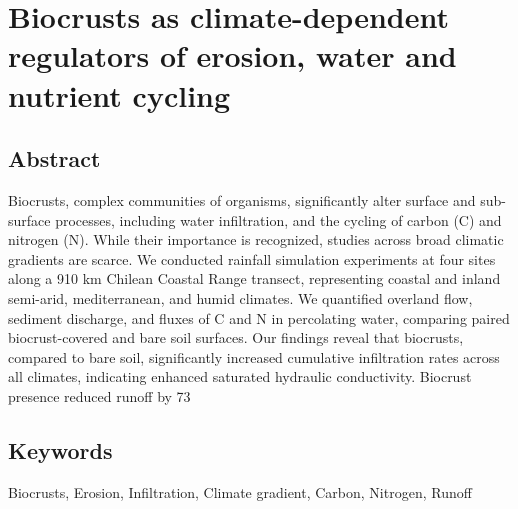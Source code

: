 \chapter{Biocrusts as climate-dependent regulators of erosion, water and nutrient cycling}
\label{chap:manuscript2} %

\section*{Abstract} %

Biocrusts, complex communities of organisms, significantly alter surface and sub-surface processes, including water infiltration, and the cycling of carbon (C) and nitrogen (N). While their importance is recognized, studies across broad climatic gradients are scarce. We conducted rainfall simulation experiments at four sites along a 910 km Chilean Coastal Range transect, representing coastal and inland semi-arid, mediterranean, and humid climates. We quantified overland flow, sediment discharge, and fluxes of C and N in percolating water, comparing paired biocrust-covered and bare soil surfaces. Our findings reveal that biocrusts, compared to bare soil, significantly increased cumulative infiltration rates across all climates, indicating enhanced saturated hydraulic conductivity. Biocrust presence reduced runoff by 73%

\section*{Keywords}

Biocrusts, Erosion, Infiltration, Climate gradient, Carbon, Nitrogen, Runoff

